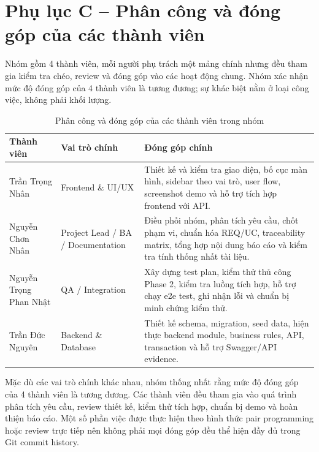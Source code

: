 \section{Phụ lục C -- Phân công và đóng góp của các thành viên}

Nhóm gồm 4 thành viên, mỗi người phụ trách một mảng chính nhưng đều tham gia kiểm tra chéo, review và đóng góp vào các hoạt động chung. Nhóm xác nhận mức độ đóng góp của 4 thành viên là tương đương; sự khác biệt nằm ở loại công việc, không phải khối lượng.

\begin{longtable}{|p{3.2cm}|p{3.2cm}|p{6.8cm}|}
\caption{Phân công và đóng góp của các thành viên trong nhóm}\\
\hline
\textbf{Thành viên} & \textbf{Vai trò chính} & \textbf{Đóng góp chính} \\
\hline
Trần Trọng Nhân & Frontend \& UI/UX &
Thiết kế và kiểm tra giao diện, bố cục màn hình, sidebar theo vai trò, user flow, screenshot demo và hỗ trợ tích hợp frontend với API. \\
\hline
Nguyễn Chơn Nhân & Project Lead / BA / Documentation &
Điều phối nhóm, phân tích yêu cầu, chốt phạm vi, chuẩn hóa REQ/UC, traceability matrix, tổng hợp nội dung báo cáo và kiểm tra tính thống nhất tài liệu. \\
\hline
Nguyễn Trọng Phan Nhật & QA / Integration &
Xây dựng test plan, kiểm thử thủ công Phase 2, kiểm tra luồng tích hợp, hỗ trợ chạy e2e test, ghi nhận lỗi và chuẩn bị minh chứng kiểm thử. \\
\hline
Trần Đức Nguyên & Backend \& Database &
Thiết kế schema, migration, seed data, hiện thực backend module, business rules, API, transaction và hỗ trợ Swagger/API evidence. \\
\hline
\end{longtable}

Mặc dù các vai trò chính khác nhau, nhóm thống nhất rằng mức độ đóng góp của 4 thành viên là tương đương. Các thành viên đều tham gia vào quá trình phân tích yêu cầu, review thiết kế, kiểm thử tích hợp, chuẩn bị demo và hoàn thiện báo cáo. Một số phần việc được thực hiện theo hình thức pair programming hoặc review trực tiếp nên không phải mọi đóng góp đều thể hiện đầy đủ trong Git commit history.

